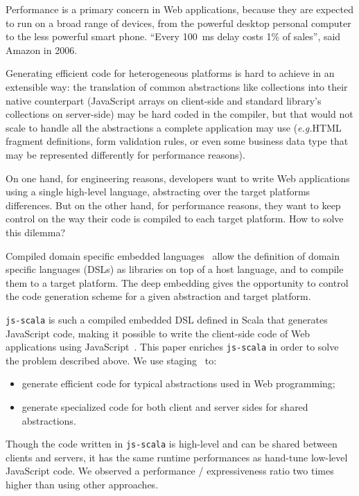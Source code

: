 \documentclass[preprint]{sigplanconf}
\newcommand{\eg}{\emph{e.g.}}
\begin{document}
Performance is a primary concern in Web applications, because they are expected to run on a broad range of devices,
from the powerful desktop personal computer to the less powerful smart phone. “Every 100~ms delay costs 1\% of
sales”, said Amazon in 2006.

Generating efficient code for heterogeneous platforms is hard to achieve in an extensible way: the translation of
common abstractions like collections into their native counterpart (JavaScript arrays on client-side and standard
library's collections on server-side) may be hard coded in the compiler, but that would not scale to handle all the
abstractions a complete application may use (\eg HTML fragment definitions, form validation rules, or even some
business data type that may be represented differently for performance reasons).

On one hand, for engineering reasons, developers want to write Web applications using a single high-level language,
abstracting over the target platforms differences. But on the other hand, for performance reasons, they want to keep
control on the way their code is compiled to each target platform. How to solve this dilemma?

Compiled domain specific embedded languages~\cite{Elliott2003_Compiling} allow the definition of domain specific
languages (DSLs) as libraries on top of a host language, and to compile them to a target platform. The deep embedding
gives the opportunity to control the code generation scheme for a given abstraction and target platform.

\texttt{js-scala} is such a compiled embedded DSL defined in Scala that generates JavaScript code, making it possible
to write the client-side code of Web applications using JavaScript~\cite{Kossakowski12_JsDESL}. This paper
enriches \texttt{js-scala} in order to solve the problem described above. We use staging~\cite{Jorring1986_Staging}
to:

\begin{itemize}
 \item generate efficient code for typical abstractions used in Web programming;
 \item generate specialized code for both client and server sides for shared abstractions.
\end{itemize}

Though the code written in \texttt{js-scala} is high-level and can be shared between clients and
servers, it has the same runtime performances as hand-tune low-level JavaScript code. We observed a performance /
expressiveness ratio two times higher than using other approaches.
\end{document}
